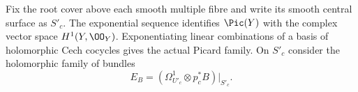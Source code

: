 Fix the root cover above each smooth multiple fibre and write its smooth central surface as $S'_c$. The exponential sequence identifies $\Pic(Y)$ with the complex vector space $H^1(Y,\OO_Y)$. Exponentiating linear combinations of a basis of holomorphic Cech cocycles gives the actual Picard family. On $S'_c$ consider the holomorphic family of bundles
\[
 E_B=(\Omega^1_{U'_c}\otimes p_c^*B)|_{S'_c}.
\]
